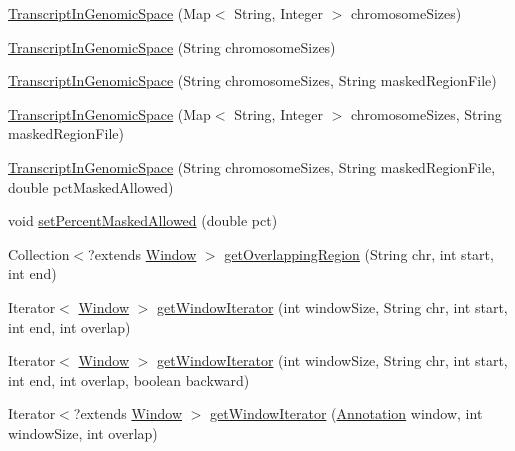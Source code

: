\begin{DoxyCompactItemize}
\item 
\hyperlink{classumms_1_1core_1_1coordinatesystem_1_1_transcript_in_genomic_space_ae58cf05bb6ff1728583f4c23287f7dd3}{Transcript\+In\+Genomic\+Space} (Map$<$ String, Integer $>$ chromosome\+Sizes)
\item 
\hyperlink{classumms_1_1core_1_1coordinatesystem_1_1_transcript_in_genomic_space_a440455703b150ddc51244d8f345c9e9c}{Transcript\+In\+Genomic\+Space} (String chromosome\+Sizes)
\item 
\hyperlink{classumms_1_1core_1_1coordinatesystem_1_1_transcript_in_genomic_space_adc0506db4345e9698bc0eb9a21601406}{Transcript\+In\+Genomic\+Space} (String chromosome\+Sizes, String masked\+Region\+File)
\item 
\hyperlink{classumms_1_1core_1_1coordinatesystem_1_1_transcript_in_genomic_space_a4d1286e18778e2d7e514f85408c4dc0b}{Transcript\+In\+Genomic\+Space} (Map$<$ String, Integer $>$ chromosome\+Sizes, String masked\+Region\+File)
\item 
\hyperlink{classumms_1_1core_1_1coordinatesystem_1_1_transcript_in_genomic_space_a851dd33c3b6f698b6ba45ef4dd30d912}{Transcript\+In\+Genomic\+Space} (String chromosome\+Sizes, String masked\+Region\+File, double pct\+Masked\+Allowed)
\item 
void \hyperlink{classumms_1_1core_1_1coordinatesystem_1_1_transcript_in_genomic_space_a82996bfc34f6efd9d1d31e001d4ec56c}{set\+Percent\+Masked\+Allowed} (double pct)
\item 
Collection$<$?extends \hyperlink{interfaceumms_1_1core_1_1feature_1_1_window}{Window} $>$ \hyperlink{classumms_1_1core_1_1coordinatesystem_1_1_transcript_in_genomic_space_a7dea0503116c1b5bed03059d3fd6d564}{get\+Overlapping\+Region} (String chr, int start, int end)
\item 
Iterator$<$ \hyperlink{interfaceumms_1_1core_1_1feature_1_1_window}{Window} $>$ \hyperlink{classumms_1_1core_1_1coordinatesystem_1_1_transcript_in_genomic_space_afb1e0148eb150e10c55a48e10eb529fd}{get\+Window\+Iterator} (int window\+Size, String chr, int start, int end, int overlap)
\item 
Iterator$<$ \hyperlink{interfaceumms_1_1core_1_1feature_1_1_window}{Window} $>$ \hyperlink{classumms_1_1core_1_1coordinatesystem_1_1_transcript_in_genomic_space_ae76fb18b3ed3c9134a2881e93d122ca1}{get\+Window\+Iterator} (int window\+Size, String chr, int start, int end, int overlap, boolean backward)
\item 
Iterator$<$?extends \hyperlink{interfaceumms_1_1core_1_1feature_1_1_window}{Window} $>$ \hyperlink{classumms_1_1core_1_1coordinatesystem_1_1_transcript_in_genomic_space_aee87b68dbf528b3d57663c8001d5e5b1}{get\+Window\+Iterator} (\hyperlink{interfaceumms_1_1core_1_1annotation_1_1_annotation}{Annotation} window, int window\+Size, int overlap)

\end{DoxyCompactItemize}
